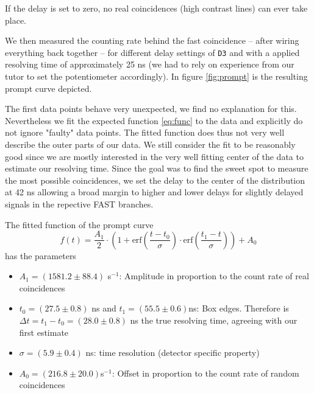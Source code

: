 \documentclass[11pt,a4paper,notitlepage]{scrartcl}
\begin{document}
If the delay is set to zero, no real coincidences (high contrast lines) can ever take place.

We then measured the counting rate behind the  fast coincidence -- after wiring everything back together --   for different delay settings of \texttt{D3} and with a applied resolving time of approximately 25 ns (we had to rely on experience from our tutor to set the potentiometer accordingly). In figure \ref{fig:prompt} is the resulting prompt curve depicted.


The first data points behave very unexpected, we find no explanation for this. Nevertheless we fit the expected function \eqref{eq:func} to the data and explicitly do not ignore "faulty" data points.  The fitted function does thus not very well describe the outer parts of our data.  We still consider the fit to be reasonably good since we are mostly interested in the very well fitting center of the data to estimate our resolving time. Since the goal was to find the sweet spot to measure the most possible coincidences, we set the delay to the center of the distribution at 42 ns allowing a broad margin to higher and lower delays for slightly delayed signals in the repective FAST branches.

The fitted function of the prompt curve
\begin{equation}\label{eq:func}
	f(t)=\frac{A_1}{2}\cdot\left(1+\text{erf}\left(\frac{t-t_0}{\sigma}\right)\cdot \text{erf}\left(\frac{t_1-t}{\sigma}\right)\right)+A_0
\end{equation}
has the parameters
\begin{itemize}
	\item $A_1=(1581.2\pm88.4)$ s$^{-1}$: Amplitude in proportion to the count rate of real coincidences
	\item $t_0=(27.5\pm0.8)$ ns and $t_1=(55.5\pm0.6)$ns: Box edges. Therefore is $\Delta t=t_1-t_0=(28.0\pm0.8)$ ns the true resolving time, agreeing with our first estimate
	\item $\sigma= (5.9\pm 0.4)$ ns: time resolution (detector specific property)
	\item $A_0=(216.8\pm20.0) $s$^{-1}$: Offset in proportion to the count rate of random coincidences
\end{itemize}
\end{document}
